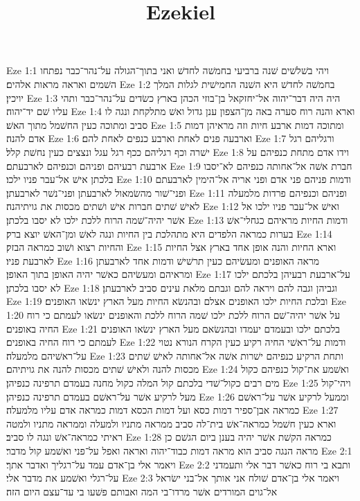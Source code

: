 

\title{Ezekiel}

Eze 1:1  ויהי בשׁלשׁים שׁנה ברביעי בחמשׁה לחדשׁ ואני בתוך־הגולה על־נהר־כבר נפתחו השׁמים ואראה מראות אלהים׃
Eze 1:2  בחמשׁה לחדשׁ היא השׁנה החמישׁית לגלות המלך יויכין׃
Eze 1:3  היה היה דבר־יהוה אל־יחזקאל בן־בוזי הכהן בארץ כשׂדים על־נהר־כבר ותהי עליו שׁם יד־יהוה׃
Eze 1:4  וארא והנה רוח סערה באה מן־הצפון ענן גדול ואשׁ מתלקחת ונגה לו סביב ומתוכה כעין החשׁמל מתוך האשׁ׃
Eze 1:5  ומתוכה דמות ארבע חיות וזה מראיהן דמות אדם להנה׃
Eze 1:6  וארבעה פנים לאחת וארבע כנפים לאחת להם׃
Eze 1:7  ורגליהם רגל ישׁרה וכף רגליהם ככף רגל עגל ונצצים כעין נחשׁת קלל׃
Eze 1:8  וידו אדם מתחת כנפיהם על ארבעת רבעיהם ופניהם וכנפיהם לארבעתם׃
Eze 1:9  חברת אשׁה אל־אחותה כנפיהם לא־יסבו בלכתן אישׁ אל־עבר פניו ילכו׃
Eze 1:10  ודמות פניהם פני אדם ופני אריה אל־הימין לארבעתם ופני־שׁור מהשׂמאול לארבעתן ופני־נשׁר לארבעתן׃
Eze 1:11  ופניהם וכנפיהם פרדות מלמעלה לאישׁ שׁתים חברות אישׁ ושׁתים מכסות את גויתיהנה׃
Eze 1:12  ואישׁ אל־עבר פניו ילכו אל אשׁר יהיה־שׁמה הרוח ללכת ילכו לא יסבו בלכתן׃
Eze 1:13  ודמות החיות מראיהם כגחלי־אשׁ בערות כמראה הלפדים היא מתהלכת בין החיות ונגה לאשׁ ומן־האשׁ יוצא ברק׃
Eze 1:14  והחיות רצוא ושׁוב כמראה הבזק׃
Eze 1:15  וארא החיות והנה אופן אחד בארץ אצל החיות לארבעת פניו׃
Eze 1:16  מראה האופנים ומעשׂיהם כעין תרשׁישׁ ודמות אחד לארבעתן ומראיהם ומעשׂיהם כאשׁר יהיה האופן בתוך האופן׃
Eze 1:17  על־ארבעת רבעיהן בלכתם ילכו לא יסבו בלכתן׃
Eze 1:18  וגביהן וגבה להם ויראה להם וגבתם מלאת עינים סביב לארבעתן׃
Eze 1:19  ובלכת החיות ילכו האופנים אצלם ובהנשׂא החיות מעל הארץ ינשׂאו האופנים׃
Eze 1:20  על אשׁר יהיה־שׁם הרוח ללכת ילכו שׁמה הרוח ללכת והאופנים ינשׂאו לעמתם כי רוח החיה באופנים׃
Eze 1:21  בלכתם ילכו ובעמדם יעמדו ובהנשׂאם מעל הארץ ינשׂאו האופנים לעמתם כי רוח החיה באופנים׃
Eze 1:22  ודמות על־ראשׁי החיה רקיע כעין הקרח הנורא נטוי על־ראשׁיהם מלמעלה׃
Eze 1:23  ותחת הרקיע כנפיהם ישׁרות אשׁה אל־אחותה לאישׁ שׁתים מכסות להנה ולאישׁ שׁתים מכסות להנה את גויתיהם׃
Eze 1:24  ואשׁמע את־קול כנפיהם כקול מים רבים כקול־שׁדי בלכתם קול המלה כקול מחנה בעמדם תרפינה כנפיהן׃
Eze 1:25  ויהי־קול מעל לרקיע אשׁר על־ראשׁם בעמדם תרפינה כנפיהן׃
Eze 1:26  וממעל לרקיע אשׁר על־ראשׁם כמראה אבן־ספיר דמות כסא ועל דמות הכסא דמות כמראה אדם עליו מלמעלה׃
Eze 1:27  וארא כעין חשׁמל כמראה־אשׁ בית־לה סביב ממראה מתניו ולמעלה וממראה מתניו ולמטה ראיתי כמראה־אשׁ ונגה לו סביב׃
Eze 1:28  כמראה הקשׁת אשׁר יהיה בענן ביום הגשׁם כן מראה הנגה סביב הוא מראה דמות כבוד־יהוה ואראה ואפל על־פני ואשׁמע קול מדבר׃
Eze 2:1  ויאמר אלי בן־אדם עמד על־רגליך ואדבר אתך׃
Eze 2:2  ותבא בי רוח כאשׁר דבר אלי ותעמדני על־רגלי ואשׁמע את מדבר אלי׃
Eze 2:3  ויאמר אלי בן־אדם שׁולח אני אותך אל־בני ישׂראל אל־גוים המורדים אשׁר מרדו־בי המה ואבותם פשׁעו בי עד־עצם היום הזה׃
